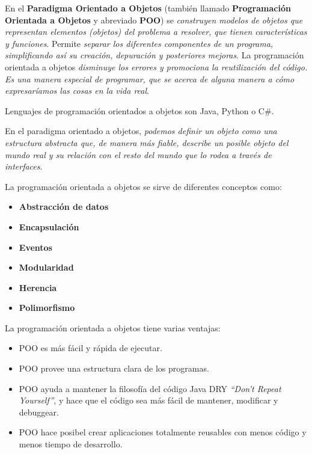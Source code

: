 \documentclass[12pt]{article}
\theoremstyle{largebreak}
\begin{document}
    \begin{exa}
        En el \textbf{Paradigma Orientado a Objetos} (también llamado \textbf{Programación Orientada a Objetos} y abreviado \textbf{POO}) se \textit{construyen modelos de objetos que representan elementos (objetos) del problema a resolver, que tienen características y funciones}. Permite \textit{separar los diferentes componentes de un programa, simplificando así su creación, depuración y posteriores mejoras}. La programación orientada a objetos \textit{disminuye los errores y promociona la reutilización del código. Es una manera especial de programar, que se acerca de alguna manera a cómo expresaríamos las cosas en la vida real}.

        Lenguajes de programación orientados a objetos son Java, Python o C\#.
    \end{exa}

    \begin{obs}
        En el paradigma orientado a objetos, \textit{podemos definir un objeto como una estructura abstracta que, de manera más fiable, describe un posible objeto del mundo real y su relación con el resto del mundo que lo rodea a través de interfaces}.
    \end{obs}

    La programación orientada a objetos se sirve de diferentes conceptos como:
    \begin{itemize}
        \item \textbf{Abstracción de datos}
        \item \textbf{Encapsulación}
        \item \textbf{Eventos}
        \item \textbf{Modularidad}
        \item \textbf{Herencia}
        \item \textbf{Polimorfismo}
    \end{itemize}

    La programación orientada a objetos tiene varias ventajas:
    \begin{itemize}
        \item POO es más fácil y rápida de ejecutar.
        \item POO provee una estructura clara de los programas.
        \item POO ayuda a mantener la filosofía del código Java DRY \textit{``Don't Repeat Yourself''}, y hace que el código sea más fácil de mantener, modificar y debuggear.
        \item POO hace posibel crear aplicaciones totalmente reusables con menos código y menos tiempo de desarrollo.
    \end{itemize}
\end{document}

